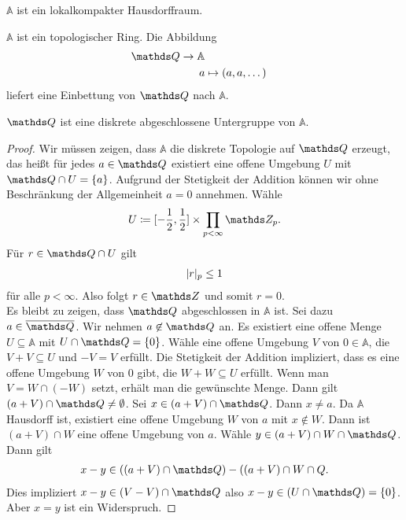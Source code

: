 \begin{bem}
$\mathbb{A}$ ist ein lokalkompakter Hausdorffraum.
\end{bem}

\begin{prop}
$\mathbb{A}$ ist ein topologischer Ring.
Die Abbildung
\begin{align*}
\Q \to \mathbb{A}\\
a &\mapsto (a,a,\dots)
\end{align*}
liefert eine Einbettung von $\Q$ nach $\mathbb{A}$.
\end{prop}

\begin{prop}
$\Q$ ist eine diskrete abgeschlossene Untergruppe von $\mathbb{A}$.
\end{prop}
\begin{proof}
Wir müssen zeigen, dass $\mathbb{A}$ die diskrete Topologie auf $\Q$ erzeugt, das heißt für jedes $a\in \Q$ existiert eine offene Umgebung $U$ mit $\Q \cap U=\{a\}$.
Aufgrund der Stetigkeit der Addition können wir ohne Beschränkung der Allgemeinheit $a=0$ annehmen.
Wähle
\begin{align*}
U\coloneqq [-\frac{1}{2},\frac{1}{2}] \times \prod_{p <\infty} \Z_p.
\end{align*}
Für $r \in \Q \cap U$ gilt
\begin{align*}
|r|_p \leq 1
\end{align*}
für alle $p<\infty$.
Also folgt $r\in \Z$ und somit $r=0$.\\
Es bleibt zu zeigen, dass $\Q$ abgeschlossen in $\mathbb{A}$ ist.
Sei dazu $a\in \overline{\Q}$. Wir nehmen $a \not \in \Q$ an.
Es existiert eine offene Menge $U \subseteq \mathbb{A}$ mit $U \cap \Q=\{0\}$.
Wähle eine offene Umgebung $V$ von $0\in \mathbb{A}$, die $V+V \subseteq U$ und $-V=V$ erfüllt.
Die Stetigkeit der Addition impliziert, dass es eine offene Umgebung $W$ von $0$ gibt, die $W+W\subseteq U$ erfüllt. Wenn man $V=W \cap (-W)$ setzt, erhält man die gewünschte Menge.
Dann gilt $(a+V)\cap \Q\not=\emptyset$.
Sei $x\in (a+V)\cap \Q$. Dann $x\not =a$.
Da $\mathbb{A}$ Hausdorff ist, existiert eine offene Umgebung $W$ von $a$ mit $x\not \in W$.
Dann ist $(a+V)\cap W$ eine offene Umgebung von $a$.
Wähle $y \in (a+V)\cap W \cap \Q$.
Dann gilt
\begin{align*}
x-y\in ((a+V)\cap \Q)-((a+V)\cap W \cap Q.
\end{align*}
Dies impliziert $x-y \in  (V-V)\cap \Q$ also $x-y\in (U\cap \Q)=\{0\}$.
Aber $x=y$ ist ein Widerspruch.
\end{proof}


